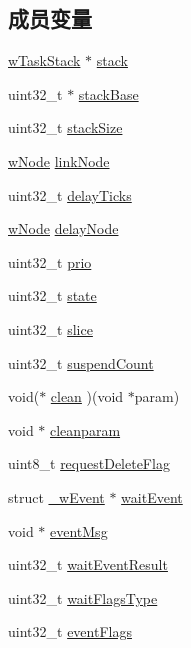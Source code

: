 \subsection*{成员变量}
\begin{DoxyCompactItemize}
\item 
\mbox{\hyperlink{w_task_8h_ae1dd34929f40dd21d0ea81f2d3f1c2e0}{w\+Task\+Stack}} $\ast$ \mbox{\hyperlink{struct__w_task_aab79976fc944e26844168b6c262e33f8}{stack}}
\item 
uint32\+\_\+t $\ast$ \mbox{\hyperlink{struct__w_task_a57eb489f59ea6a56ccff2efea7f92c33}{stack\+Base}}
\item 
uint32\+\_\+t \mbox{\hyperlink{struct__w_task_ae20ace955faaa4fb797b69b75feef3d3}{stack\+Size}}
\item 
\mbox{\hyperlink{w_lib_8h_a98363f2fc9ff1bef5993786140d900f2}{w\+Node}} \mbox{\hyperlink{struct__w_task_aace0256afebaf717de11433d186f53b2}{link\+Node}}
\item 
uint32\+\_\+t \mbox{\hyperlink{struct__w_task_a0c1ef2b42e60232fd2355246df290c68}{delay\+Ticks}}
\item 
\mbox{\hyperlink{w_lib_8h_a98363f2fc9ff1bef5993786140d900f2}{w\+Node}} \mbox{\hyperlink{struct__w_task_a2dfdbd06053445a3e8869801ea875edc}{delay\+Node}}
\item 
uint32\+\_\+t \mbox{\hyperlink{struct__w_task_a6871573fefee3ad102e26a09e7a2f493}{prio}}
\item 
uint32\+\_\+t \mbox{\hyperlink{struct__w_task_a1b0c7bd4d79798ef4e0ce23894c9aeb2}{state}}
\item 
uint32\+\_\+t \mbox{\hyperlink{struct__w_task_a4fe7f19d35a11368d300b99348451fdd}{slice}}
\item 
uint32\+\_\+t \mbox{\hyperlink{struct__w_task_a70023864793bcef3ab18d4a66832ca6d}{suspend\+Count}}
\item 
void($\ast$ \mbox{\hyperlink{struct__w_task_a9350eb6ea9f174b0711e8835a1543a87}{clean}} )(void $\ast$param)
\item 
void $\ast$ \mbox{\hyperlink{struct__w_task_a44efa3d1143953e06ee78314f155aa92}{cleanparam}}
\item 
uint8\+\_\+t \mbox{\hyperlink{struct__w_task_a3b197900b58be56e296d46207dec079f}{request\+Delete\+Flag}}
\item 
struct \mbox{\hyperlink{struct__w_event}{\+\_\+w\+Event}} $\ast$ \mbox{\hyperlink{struct__w_task_a52896f1a7ded634042291bac3f2b109e}{wait\+Event}}
\item 
void $\ast$ \mbox{\hyperlink{struct__w_task_ae1ae004c581e0cc9fd22662535700001}{event\+Msg}}
\item 
uint32\+\_\+t \mbox{\hyperlink{struct__w_task_a37707d87e42a484588393e5b3683ffbb}{wait\+Event\+Result}}
\item 
uint32\+\_\+t \mbox{\hyperlink{struct__w_task_a35ba8bba537f36efd05f084a5531825a}{wait\+Flags\+Type}}
\item 
uint32\+\_\+t \mbox{\hyperlink{struct__w_task_af713ddc7d68fde45ace722a554f41918}{event\+Flags}}
\end{DoxyCompactItemize}


